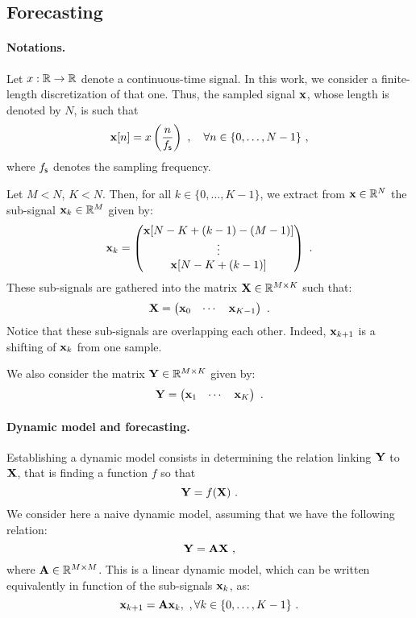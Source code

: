 
\subsection{Forecasting}

\paragraph{Notations.} Let $x:{\mathbb R}\to{\mathbb R}$ denote a continuous-time signal. In this work, we consider a finite-length discretization of that one. Thus, the sampled signal ${\mathbf x}$, whose length is denoted by $N$, is such that
\[
\bx[n] = x\left(\frac{n}{\fs}\right)\ ,\quad \forall n\in\{0,\ldots,N-1\}\ , 
\]
where $f_{\mathsf s}$ denotes the sampling frequency. 

Let $M<N$, $K<N$. Then, for all $k\in\{0,\ldots,K-1\}$, we extract from ${\mathbf x}\in{\mathbb R}^N$ the sub-signal ${\mathbf x}_k\in{\mathbb R}^M$ given by:
\[
{\mathbf x}_k = 
\begin{pmatrix}
{\mathbf x}[N-K+(k-1)-(M-1)] \\
\vdots \\
{\mathbf x}[N-K+(k-1)]
\end{pmatrix}\ .
\]  
These sub-signals are gathered into the matrix ${\mathbf X}\in{\mathbb R}^{M\times K}$ such that:
\[
{\mathbf X} = 
\begin{pmatrix}
{\mathbf x}_0 & \cdots & {\mathbf x}_{K-1}
\end{pmatrix}\ .
\]
Notice that these sub-signals are overlapping each other. Indeed, ${\mathbf x}_{k+1}$ is a shifting of ${\mathbf x}_k$ from one sample.

We also consider the matrix ${\mathbf Y}\in{\mathbb R}^{M\times K}$ given by:
\[
{\mathbf Y} = 
\begin{pmatrix}
{\mathbf x}_1 & \cdots & {\mathbf x}_{K}
\end{pmatrix}\ .
\]

\paragraph{Dynamic model and forecasting.} Establishing a dynamic model consists in determining the relation linking ${\mathbf Y}$ to ${\mathbf X}$, that is finding a function $f$ so that
\[
{\mathbf Y} = f({\mathbf X})\ .
\] 
We consider here a naive dynamic model, assuming that we have the following relation:
\begin{equation}
{\mathbf Y} = {\mathbf A}{\mathbf X}\ ,
\end{equation}
where ${\mathbf A}\in{\mathbb R}^{M\times M}$. This is a linear dynamic model, which can be written equivalently in function of the sub-signals ${\mathbf x}_k$, as:
\begin{equation}
{\mathbf x}_{k+1} = {\mathbf A}{\mathbf x}_{k},\ ,\forall k\in\{0,\dots,K-1\}\ .
\end{equation}



